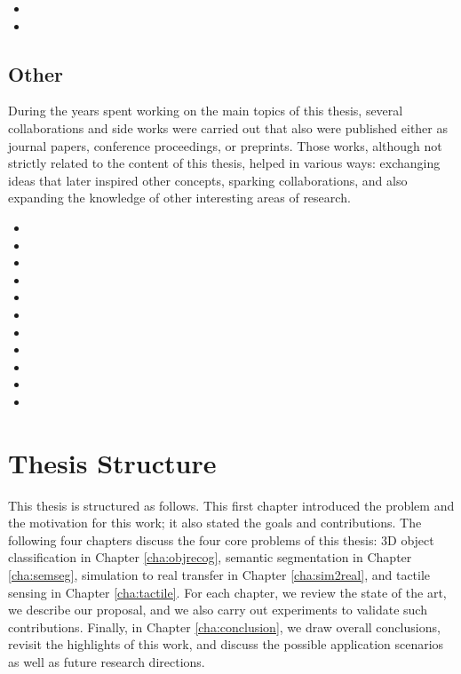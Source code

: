 \begin{itemize}
  \item {}
  \item {}
\end{itemize}

\subsection{Other}

During the years spent working on the main topics of this thesis, several collaborations and side works were carried out that also were published either as journal papers, conference proceedings, or preprints. Those works, although not strictly related to the content of this thesis, helped in various ways: exchanging ideas that later inspired other concepts, sparking collaborations, and also expanding the knowledge of other interesting areas of research.

\begin{itemize}
  \item {}
  \item {}
  \item {}
  \item {}
  \item {}
  \item {}
  \item {}
  \item {}
  \item {}
  \item {}
  \item {}
\end{itemize}

\section{Thesis Structure}
\label{cha:introduction:sec:structure}

This thesis is structured as follows. This first chapter introduced the problem and the motivation for this work; it also stated the goals and contributions. The following four chapters discuss the four core problems of this thesis: 3D object classification in Chapter \ref{cha:objrecog}, semantic segmentation in Chapter \ref{cha:semseg}, simulation to real transfer in Chapter \ref{cha:sim2real}, and tactile sensing in Chapter \ref{cha:tactile}. For each chapter, we review the state of the art, we describe our proposal, and we also carry out experiments to validate such contributions. Finally, in Chapter \ref{cha:conclusion}, we draw overall conclusions, revisit the highlights of this work, and discuss the possible application scenarios as well as future research directions.